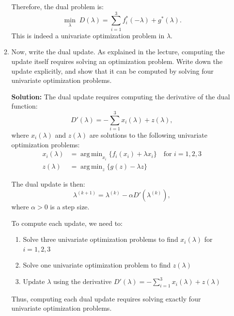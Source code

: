 \documentclass{article}
\DeclareMathOperator*{\argmin}{arg\,min}
\begin{document}
\begin{enumerate}
\begin{enumerate}
        Therefore, the dual problem is:
        \[
        \min_{\lambda} \; D(\lambda) = \sum_{i=1}^3 f_i^*(-\lambda) + g^*(\lambda).
        \]
        This is indeed a univariate optimization problem in $\lambda$.

        \item Now, write the dual update. As explained in the lecture, computing the update itself requires solving an optimization problem. Write down the update explicitly, and show that it can be computed by solving four univariate optimization problems.

        \textbf{Solution:} The dual update requires computing the derivative of the dual function:
        \[
        D'(\lambda) = -\sum_{i=1}^3 x_i(\lambda) + z(\lambda),
        \]
        where $x_i(\lambda)$ and $z(\lambda)$ are solutions to the following univariate optimization problems:
        \begin{align*}
            x_i(\lambda) &= \argmin_{x_i} \{ f_i(x_i) + \lambda x_i \} \quad \text{for } i = 1,2,3 \\
            z(\lambda) &= \argmin_{z} \{ g(z) - \lambda z \}
        \end{align*}

        The dual update is then:
        \[
        \lambda^{(k+1)} = \lambda^{(k)} - \alpha D'(\lambda^{(k)}),
        \]
        where $\alpha > 0$ is a step size.

        To compute each update, we need to:
        \begin{enumerate}
            \item Solve three univariate optimization problems to find $x_i(\lambda)$ for $i = 1,2,3$
            \item Solve one univariate optimization problem to find $z(\lambda)$
            \item Update $\lambda$ using the derivative $D'(\lambda) = -\sum_{i=1}^3 x_i(\lambda) + z(\lambda)$
        \end{enumerate}

        Thus, computing each dual update requires solving exactly four univariate optimization problems.
    \end{enumerate}
\end{enumerate}
\end{document}

